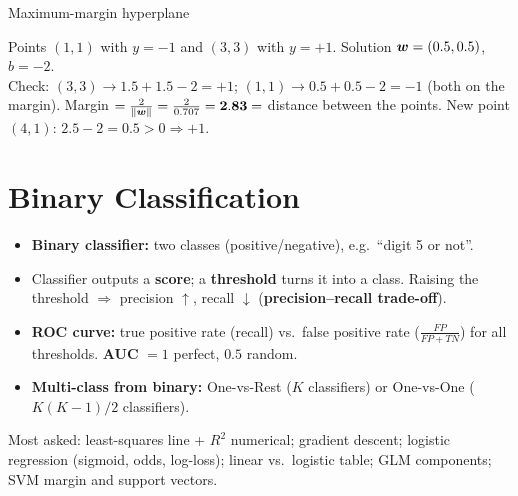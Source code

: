 \begin{drawit}{Maximum-margin hyperplane}
\centering
{}
\end{drawit}

\begin{numer}[: margin]
Points $(1,1)$ with $y=-1$ and $(3,3)$ with $y=+1$. Solution $\boldsymbol{w}=(0.5,0.5)$, $b=-2$.\\
Check: $(3,3)\to1.5+1.5-2=+1$; $(1,1)\to0.5+0.5-2=-1$ (both on the margin). Margin $=\frac2{\|\boldsymbol{w}\|}=\frac2{0.707}=\mathbf{2.83}=$ distance between the points. New point $(4,1)$: $2.5-2=0.5>0\Rightarrow+1$.
\end{numer}

\section{Binary Classification}
\begin{itemize}
  \item \textbf{Binary classifier:} two classes (positive/negative), e.g.\ ``digit 5 or not''.
  \item Classifier outputs a \textbf{score}; a \textbf{threshold} turns it into a class. Raising the threshold $\Rightarrow$ precision $\uparrow$, recall $\downarrow$ (\textbf{precision--recall trade-off}).
  \item \textbf{ROC curve:} true positive rate (recall) vs.\ false positive rate ($\frac{FP}{FP+TN}$) for all thresholds. \textbf{AUC} $=1$ perfect, $0.5$ random.
  \item \textbf{Multi-class from binary:} One-vs-Rest ($K$ classifiers) or One-vs-One ($K(K-1)/2$ classifiers).
\end{itemize}

\begin{imp}
Most asked: least-squares line + $R^2$ numerical; gradient descent; logistic regression (sigmoid, odds, log-loss); linear vs.\ logistic table; GLM components; SVM margin and support vectors.
\end{imp}

